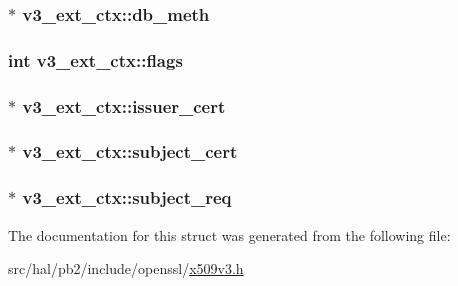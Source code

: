 \subsubsection[{\texorpdfstring{db\+\_\+meth}{db_meth}}]{$\ast$ v3\+\_\+ext\+\_\+ctx\+::db\+\_\+meth}\hypertarget{structv3__ext__ctx_a7e8b728812e1ae2216de8991faeae558}{}\label{structv3__ext__ctx_a7e8b728812e1ae2216de8991faeae558}
\subsubsection[{\texorpdfstring{flags}{flags}}]{\setlength{\rightskip}{0pt plus 5cm}int v3\+\_\+ext\+\_\+ctx\+::flags}\hypertarget{structv3__ext__ctx_aef13996482523a866443b3160db73291}{}\label{structv3__ext__ctx_aef13996482523a866443b3160db73291}
\subsubsection[{\texorpdfstring{issuer\+\_\+cert}{issuer_cert}}]{$\ast$ v3\+\_\+ext\+\_\+ctx\+::issuer\+\_\+cert}\hypertarget{structv3__ext__ctx_a727f0302b59312053fdcbd09a195cf85}{}\label{structv3__ext__ctx_a727f0302b59312053fdcbd09a195cf85}
\subsubsection[{\texorpdfstring{subject\+\_\+cert}{subject_cert}}]{$\ast$ v3\+\_\+ext\+\_\+ctx\+::subject\+\_\+cert}\hypertarget{structv3__ext__ctx_ab93937a6f72e09c41303ebe54c6aa6be}{}\label{structv3__ext__ctx_ab93937a6f72e09c41303ebe54c6aa6be}
\subsubsection[{\texorpdfstring{subject\+\_\+req}{subject_req}}]{$\ast$ v3\+\_\+ext\+\_\+ctx\+::subject\+\_\+req}\hypertarget{structv3__ext__ctx_a2c538c77545078ac3834d7ec19baa2e1}{}\label{structv3__ext__ctx_a2c538c77545078ac3834d7ec19baa2e1}


The documentation for this struct was generated from the following file\+:\begin{DoxyCompactItemize}
\item 
src/hal/pb2/include/openssl/\hyperlink{x509v3_8h}{x509v3.\+h}\end{DoxyCompactItemize}
